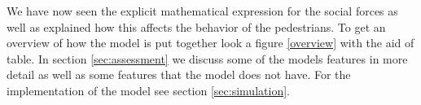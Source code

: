 We have now seen the explicit mathematical expression for the social forces 
as well as explained how this affects the behavior of the pedestrians. To get an 
overview of how the model is put together look a figure \ref{overview} with 
the aid of table. In section \ref{sec:assessment} 
we discuss some of the models features in more detail as well as some features 
that the model does not have. For the implementation of the model see section \ref{sec:simulation}.
